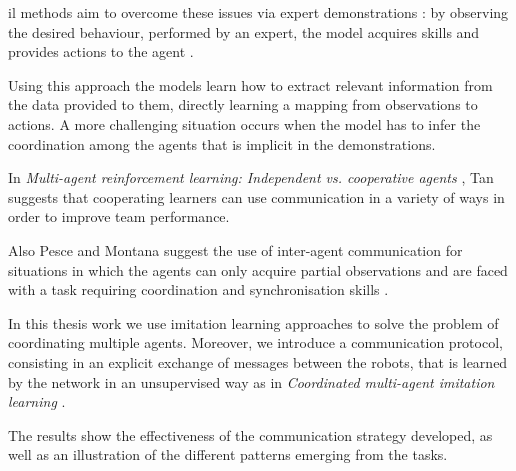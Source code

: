 \gls{il} methods \cite[][]{schaal1999imitation, stepputtis2019imitation} aim to 
overcome these issues via expert demonstrations \cite[][]{song2018multi}: by 
observing the desired behaviour, performed by an expert, the model acquires 
skills and provides actions to the agent \cite[][]{zhang2018deep, 
billard2008survey}.

Using this approach the models learn how to extract relevant information from 
the data provided to them, directly learning a mapping from observations to 
actions. 
A more challenging situation occurs when the model has to infer the coordination 
among the agents that is implicit in the demonstrations.

In \emph{Multi-agent reinforcement learning: Independent vs. cooperative 
agents} \cite[][]{tan1993multi}, Tan suggests that cooperating learners can use 
communication in a variety of ways in order to improve team performance. 

Also Pesce and Montana suggest the use of inter-agent communication for 
situations in which the agents can only acquire partial observations and are faced 
with a task requiring coordination and synchronisation skills 
\cite[][]{pesce2019improving}.

In this thesis work we use imitation learning approaches to solve the problem of 
coordinating multiple agents. Moreover, we introduce a communication protocol, 
consisting in an explicit exchange of messages between the robots, that is 
learned by the network in an unsupervised way as in \emph{Coordinated 
multi-agent imitation learning} \cite[][]{le2017coordinated}. 

The results show the effectiveness of the communication strategy developed, as 
well as an illustration of the different patterns emerging from the tasks.
